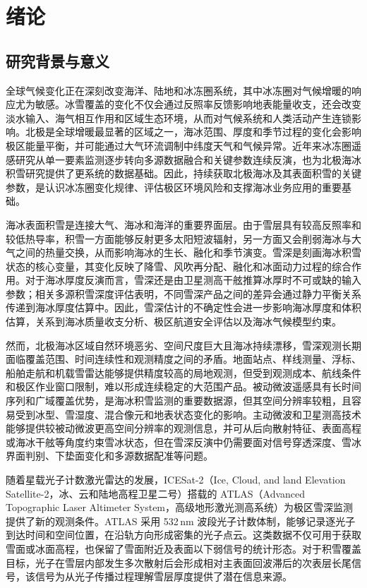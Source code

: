 \cleardoublepage

\section{绪论}

\subsection{研究背景与意义}
全球气候变化正在深刻改变海洋、陆地和冰冻圈系统，其中冰冻圈对气候增暖的响应尤为敏感。冰雪覆盖的变化不仅会通过反照率反馈影响地表能量收支，还会改变淡水输入、海气相互作用和区域生态环境，从而对气候系统和人类活动产生连锁影响\citep{IPCC2019SROCC,Lenton2019,zhongxinyue2020arctic}。北极是全球增暖最显著的区域之一，海冰范围、厚度和季节过程的变化会影响极区能量平衡，并可能通过大气环流调制中纬度天气和气候异常\citep{Cohen2014}。近年来冰冻圈遥感研究从单一要素监测逐步转向多源数据融合和关键参数连续反演，也为北极海冰积雪研究提供了更系统的数据基础\citep{ranyouhua2025cryosphere}。因此，持续获取北极海冰及其表面积雪的关键参数，是认识冰冻圈变化规律、评估极区环境风险和支撑海冰业务应用的重要基础。

海冰表面积雪是连接大气、海冰和海洋的重要界面层。由于雪层具有较高反照率和较低热导率，积雪一方面能够反射更多太阳短波辐射，另一方面又会削弱海冰与大气之间的热量交换，从而影响海冰的生长、融化和季节演变。雪深是刻画海冰积雪状态的核心变量，其变化反映了降雪、风吹再分配、融化和冰面动力过程的综合作用。对于海冰厚度反演而言，雪深还是由卫星测高干舷推算冰厚时不可或缺的输入参数；相关多源积雪深度评估表明，不同雪深产品之间的差异会通过静力平衡关系传递到海冰厚度估算中\citep{zhouyi2023arcticsnow}。因此，雪深估计的不确定性会进一步影响海冰厚度和体积估算，关系到海冰质量收支分析、极区航道安全评估以及海冰气候模型约束。

然而，北极海冰区域自然环境恶劣、空间尺度巨大且海冰持续漂移，雪深观测长期面临覆盖范围、时间连续性和观测精度之间的矛盾。地面站点、样线测量、浮标、船舶走航和机载雪雷达能够提供精度较高的局地观测，但受到观测成本、航线条件和极区作业窗口限制，难以形成连续稳定的大范围产品。被动微波遥感具有长时间序列和广域覆盖优势，是海冰积雪监测的重要数据源，但其空间分辨率较粗，且容易受到冰型、雪湿度、混合像元和地表状态变化的影响。主动微波和卫星测高技术能够提供较被动微波更高空间分辨率的观测信息，并可从后向散射特征、表面高程或海冰干舷等角度约束雪冰状态，但在雪深反演中仍需要面对信号穿透深度、雪冰界面判别、下垫面变化和多源数据配准等问题。

随着星载光子计数激光雷达的发展，ICESat-2（Ice, Cloud, and land Elevation Satellite-2，冰、云和陆地高程卫星二号）搭载的 ATLAS（Advanced Topographic Laser Altimeter System，高级地形激光测高系统）为极区雪深监测提供了新的观测条件。ATLAS 采用 532\,nm 波段光子计数体制，能够记录逐光子到达时间和空间位置，在沿轨方向形成密集的光子点云\citep{ICESat2_GSFC}。这类数据不仅可用于获取雪面或冰面高程，也保留了雪面附近及表面以下弱信号的统计形态。对于积雪覆盖目标，光子在雪层内部发生多次散射后会形成相对主表面回波滞后的次表层长尾信号，该信号为从光子传播过程理解雪层厚度提供了潜在信息来源。

